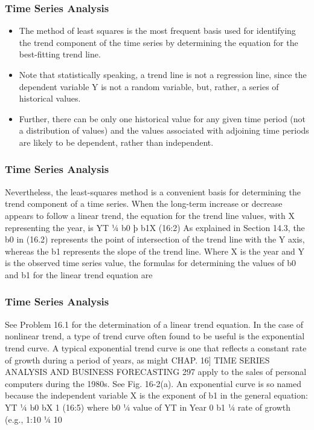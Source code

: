 \documentclass{beamer}
\begin{document}
\begin{frame}
\frametitle{Time Series Analysis}
\begin{itemize}
\item The method of least squares is the most frequent basis used for identifying the trend
component of the time series by determining the equation for the best-fitting trend line. 
\item Note that statistically
speaking, a trend line is not a regression line, since the dependent variable Y is not a random variable, but,
rather, a series of historical values. 
\item Further, there can be only one historical value for any given time period (not
a distribution of values) and the values associated with adjoining time periods are likely to be dependent, rather
than independent. 
\end{itemize}
\end{frame}
\begin{frame}
\frametitle{Time Series Analysis}
Nevertheless, the least-squares method is a convenient basis for determining the trend
component of a time series. When the long-term increase or decrease appears to follow a linear trend, the
equation for the trend line values, with X representing the year, is
YT ¼ b0 þ b1X (16:2)
As explained in Section 14.3, the b0 in (16.2) represents the point of intersection of the trend line with the Y
axis, whereas the b1 represents the slope of the trend line. Where X is the year and Y is the observed time series
value, the formulas for determining the values of b0 and b1 for the linear trend equation are
\end{frame}
\begin{frame}
\frametitle{Time Series Analysis}
See Problem 16.1 for the determination of a linear trend equation.
In the case of nonlinear trend, a type of trend curve often found to be useful is the exponential trend curve.
A typical exponential trend curve is one that reflects a constant rate of growth during a period of years, as might
CHAP. 16] TIME SERIES ANALYSIS AND BUSINESS FORECASTING 297
apply to the sales of personal computers during the 1980s. See Fig. 16-2(a). An exponential curve is so named
because the independent variable X is the exponent of b1 in the general equation:
YT ¼ b0 bX
1 (16:5)
where b0 ¼ value of YT in Year 0
b1 ¼ rate of growth (e.g., 1:10 ¼ 10%
\end{frame}
\end{document}
